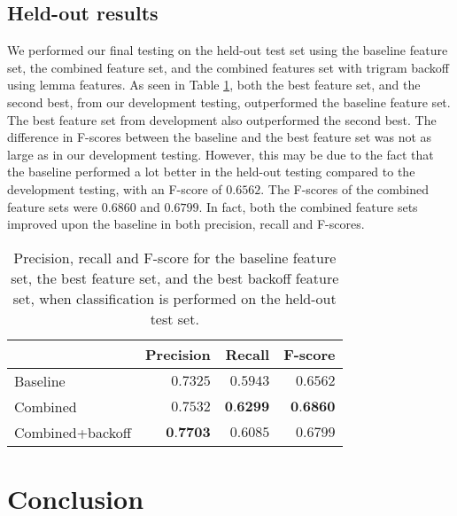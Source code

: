\documentclass[11pt,letterpaper]{article}
\begin{document}
\subsection{Held-out results}
\label{sec:heldout}

We performed our final testing on the held-out test set using the baseline feature set, the combined feature set, and the combined features set with trigram backoff using lemma features. As seen in Table \ref{tab:heldout}, both the best feature set, and the second best, from our development testing, outperformed the baseline feature set. The best feature set from development also outperformed the second best. The difference in F-scores between the baseline and the best feature set was not as large as in our development testing. However, this may be due to the fact that the baseline performed a lot better in the held-out testing compared to the development testing, with an F-score of $0.6562$. The F-scores of the combined feature sets were $0.6860$ and $0.6799$. In fact, both the combined feature sets improved upon the baseline in both precision, recall and F-scores.



\begin{table}
\begin{smaller}
  \begin{center}
    \begin{tabular}{lrrr}
      \toprule      
      & Precision & Recall & F-score\\
      \midrule
      Baseline & $0.7325$ & $0.5943$ & $0.6562$ \\
      Combined & $0.7532$ & $\textbf{0.6299}$ & $\textbf{0.6860}$  \\
      Combined+backoff & $\textbf{0.7703}$ & $0.6085$ & $0.6799$ \\            
      \bottomrule
    \end{tabular}
  \end{center}
  \caption{Precision, recall and F-score for the baseline feature set, the best feature set, and the best backoff feature set, when classification is performed on the held-out test set.}
  \label{tab:heldout}
\end{smaller}
\end{table}



\section{Conclusion}
\label{sec:conclusion}



\end{document}
